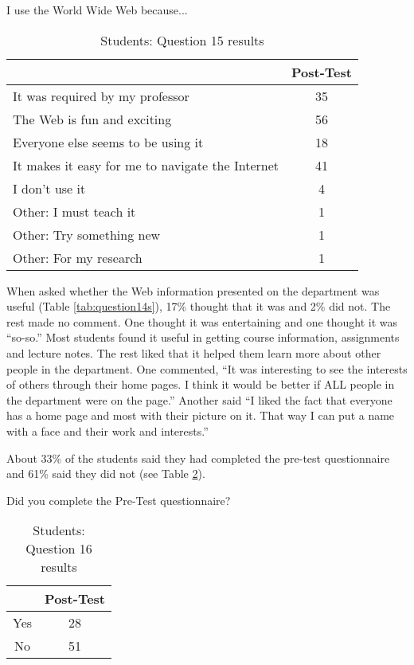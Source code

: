 \begin{table}[htbp]
\caption{Students: Question 15 results}
{I use the World Wide Web because...}
\begin{center}
\begin{tabular}{|l|c|} \hline
  & {\bf Post-Test} \\ \hline 
 {It was required by my professor} & 35 \\ \hline 
 {The Web is fun and exciting} & 56 \\ \hline 
 {Everyone else seems to be using it} & 18 \\ \hline 
 {It makes it easy for me to navigate the Internet} & 41 \\ \hline 
 {I don't use it} & 4 \\ \hline 
 {Other: I must teach it} & 1 \\ \hline 
 {Other: Try something new} & 1 \\ \hline 
 {Other: For my research} & 1 \\ \hline 
\end{tabular}
\end{center}
\label{tab:question15s}
\end{table}

When asked whether the Web information presented on the department was useful
(Table \ref{tab:question14s}), 17\% thought that it was and 2\% did not.  The
rest made no comment.  One thought it was entertaining and one thought it was
``so-so.''  Most students found it useful in getting course information,
assignments and lecture notes.  The rest liked that it helped them learn more
about other people in the department.  One commented, ``It was interesting to
see the interests of others through their home pages.  I think it would be
better if ALL people in the department were on the page.''  Another said ``I
liked the fact that everyone has a home page and most with their picture on it.
That way I can put a name with a face and their work and interests.''

About 33\% of the students said they had completed the pre-test questionnaire
and 61\% said they did not (see Table \ref{tab:question16s}).

\begin{table}[htbp]
\caption{Students: Question 16 results}
{Did you complete the Pre-Test questionnaire?}
\begin{center}
\begin{tabular}{|c|c|} \hline
  & {\bf Post-Test} \\ \hline 
 Yes & 28 \\ \hline 
 No  & 51 \\ \hline 
\end{tabular}
\end{center}
\label{tab:question16s}
\end{table}

